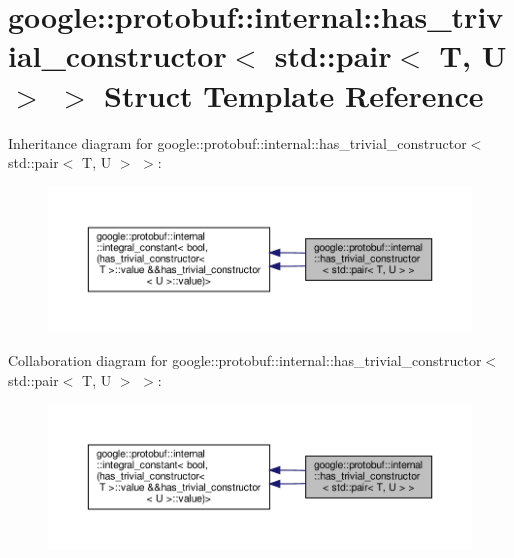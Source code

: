 \hypertarget{structgoogle_1_1protobuf_1_1internal_1_1has__trivial__constructor_3_01std_1_1pair_3_01T_00_01U_01_4_01_4}{}\section{google\+:\+:protobuf\+:\+:internal\+:\+:has\+\_\+trivial\+\_\+constructor$<$ std\+:\+:pair$<$ T, U $>$ $>$ Struct Template Reference}
\label{structgoogle_1_1protobuf_1_1internal_1_1has__trivial__constructor_3_01std_1_1pair_3_01T_00_01U_01_4_01_4}


Inheritance diagram for google\+:\+:protobuf\+:\+:internal\+:\+:has\+\_\+trivial\+\_\+constructor$<$ std\+:\+:pair$<$ T, U $>$ $>$\+:
\nopagebreak
\begin{figure}[H]
\begin{center}
\leavevmode
\includegraphics[width=350pt]{structgoogle_1_1protobuf_1_1internal_1_1has__trivial__constructor_3_01std_1_1pair_3_01T_00_01U_01_4_01_4__inherit__graph}
\end{center}
\end{figure}


Collaboration diagram for google\+:\+:protobuf\+:\+:internal\+:\+:has\+\_\+trivial\+\_\+constructor$<$ std\+:\+:pair$<$ T, U $>$ $>$\+:
\nopagebreak
\begin{figure}[H]
\begin{center}
\leavevmode
\includegraphics[width=350pt]{structgoogle_1_1protobuf_1_1internal_1_1has__trivial__constructor_3_01std_1_1pair_3_01T_00_01U_01_4_01_4__coll__graph}
\end{center}
\end{figure}
